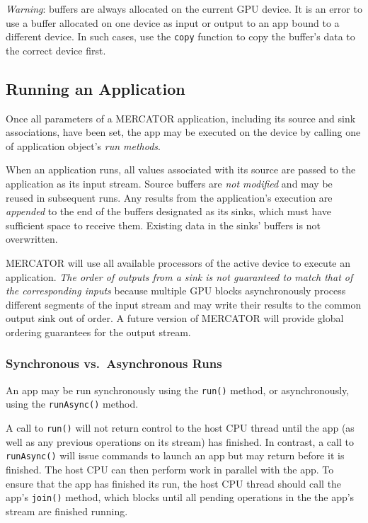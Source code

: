 \documentclass[11pt]{article}
\begin{document}
\textit{Warning}: buffers are always allocated on the current GPU
device.  It is an error to use a buffer allocated on one device as
input or output to an app bound to a different device.  In such cases,
use the \texttt{copy} function to copy the buffer's data to the
correct device first.
 
\subsection{Running an Application}

Once all parameters of a MERCATOR application, including its source
and sink associations, have been set, the app may be executed on the
device by calling one of application object's \textit{run methods}.

When an application runs, all values associated with its source are
passed to the application as its input stream. Source buffers are
\emph{not modified} and may be reused in subsequent runs.  Any results
from the application's execution are \emph{appended} to the end of the
buffers designated as its sinks, which must have sufficient space to
receive them.  Existing data in the sinks' buffers is not overwritten.

MERCATOR will use all available processors of the active device to
execute an application.  \emph{The order of outputs from a sink is not
  guaranteed to match that of the corresponding inputs} because
multiple GPU blocks asynchronously process different segments of the
input stream and may write their results to the common output sink out
of order.  A future version of MERCATOR will provide global ordering
guarantees for the output stream.

\subsubsection{Synchronous vs.\ Asynchronous Runs}

An app may be run synchronously using the \texttt{run()} method,
or asynchronously, using the \texttt{runAsync()} method.

A call to \texttt{run()} will not return control to the host CPU
thread until the app (as well as any previous operations on its
stream) has finished.  In contrast, a call to \texttt{runAsync()} will
issue commands to launch an app but may return before it is finished.
The host CPU can then perform work in parallel with the app.  To
ensure that the app has finished its run, the host CPU thread should
call the app's \texttt{join()} method, which blocks until all pending
operations in the the app's stream are finished running.
\end{document}
